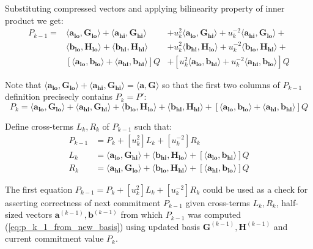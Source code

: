 \documentclass[../lecture-notes-148x210.tex]{subfiles}
\begin{document}
Substituting compressed vectors and applying bilinearity property of inner product we get:
\begin{align*}
    P_{k-1} = & \langle \mathbf{a_{lo}}, \mathbf{G_{lo}}\rangle + \langle \mathbf{a_{hi}}, \mathbf{G_{hi}}\rangle &+ u_k^2\langle \mathbf{a_{lo}}, \mathbf{G_{hi}}\rangle + u_k^{-2}\langle \mathbf{a_{hi}}, \mathbf{G_{lo}}\rangle + \\
    & \langle \mathbf{b_{lo}}, \mathbf{H_{lo}}\rangle + \langle \mathbf{b_{hi}}, \mathbf{H_{hi}}\rangle &+ u_k^2\langle \mathbf{b_{hi}}, \mathbf{H_{lo}}\rangle + u_k^{-2}\langle \mathbf{b_{lo}}, \mathbf{H_{hi}}\rangle + \\
    & [\langle \mathbf{a_{lo}}, \mathbf{b_{lo}}\rangle + \langle \mathbf{a_{hi}}, \mathbf{b_{hi}}\rangle]Q &+ [u_k^2\langle \mathbf{a_{lo}}, \mathbf{b_{hi}}\rangle + u_k^{-2}\langle \mathbf{a_{hi}}, \mathbf{b_{lo}}\rangle]Q
\end{align*}

Note that $\langle \mathbf{a_{lo}}, \mathbf{G_{lo}}\rangle + \langle \mathbf{a_{hi}}, \mathbf{G_{hi}}\rangle = \langle \mathbf{a,G}\rangle$ so that the first two columns of $P_{k-1}$ definition precisecly contains $P_{k} = P'$:
$$P_{k} = \langle \mathbf{a_{lo}}, \mathbf{G_{lo}}\rangle + \langle \mathbf{a_{hi}}, \mathbf{G_{hi}}\rangle + \langle \mathbf{b_{lo}}, \mathbf{H_{lo}}\rangle + \langle \mathbf{b_{hi}}, \mathbf{H_{hi}}\rangle + [\langle \mathbf{a_{lo}}, \mathbf{b_{lo}}\rangle + \langle \mathbf{a_{hi}}, \mathbf{b_{hi}}\rangle]Q$$

Define cross-terms $L_k, R_k$ of $P_{k-1}$ such that:
\begin{align*}
    P_{k-1} &= P_k + [u_k^2] L_k + [u_k^{-2}] R_k \\
    L_{k} &= \langle \mathbf{a_{lo}}, \mathbf{G_{hi}}\rangle + \langle \mathbf{b_{hi}}, \mathbf{H_{lo}}\rangle + [\langle \mathbf{a_{lo}}, \mathbf{b_{hi}}\rangle]Q \\
    R_{k} &= \langle \mathbf{a_{hi}}, \mathbf{G_{lo}}\rangle + \langle \mathbf{b_{lo}}, \mathbf{H_{hi}}\rangle + [\langle \mathbf{a_{hi}}, \mathbf{b_{lo}}\rangle]Q
\end{align*}

The first equation $P_{k-1} = P_k + [u_k^2] L_k + [u_k^{-2}] R_k$ could be used as a check for asserting correctness of next commitment $P_{k-1}$ given cross-terms $L_k, R_k$, half-sized vectors $\mathbf{a}^{(k-1)}, \mathbf{b}^{(k-1)}$ from which $P_{k-1}$ was computed (\ref{eq:p_k_1_from_new_basis}) using updated basis $\mathbf{G}^{(k-1)}, \mathbf{H}^{(k-1)}$ and current commitment value $P_k$.
\end{document}
